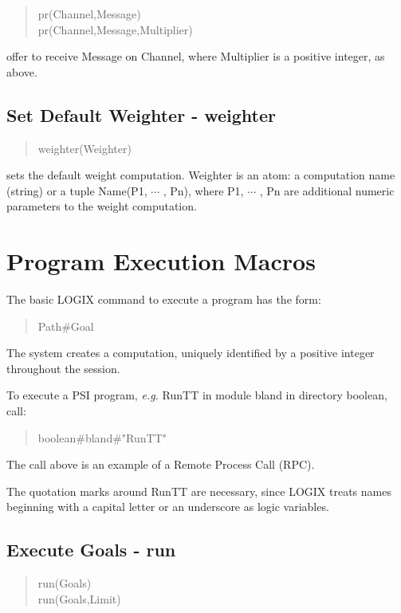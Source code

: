 \begin{verse}
pr(Channel,Message) \\
pr(Channel,Message,Multiplier)
\end{verse}

\noindent
offer to receive Message on Channel, where Multiplier is a positive 
integer, as above.

\subsection{Set Default Weighter - weighter}
\label{weighter macro}
\begin{verse}
weighter(Weighter)
\end{verse}

\noindent
sets the default weight computation.  Weighter  is an atom: a computation name
(string) or a tuple  Name(P1, $\cdots$ , Pn), where P1, $\cdots$ , Pn
are additional numeric parameters to the weight computation.


\section{Program Execution Macros}
\label{macros}

The basic LOGIX command to execute a program has the form:

\begin{verse}
Path\#Goal
\end{verse}

\noindent
The system creates a computation, uniquely identified by a positive
integer throughout the session.

\noindent
To execute a PSI program, {\em e.g.} RunTT in module bland in directory
boolean, call:

\begin{verse}
    boolean\#bland\#"RunTT"
\end{verse}

\noindent
The call above is an example of a Remote Process Call (RPC).

\noindent
The quotation marks around RunTT are necessary, since LOGIX
treats names beginning with a capital letter or an underscore as logic
variables.

\subsection{Execute Goals - run}
\label{runners}

\begin{verse}
    run(Goals) \\
    run(Goals,Limit)
\end{verse}

